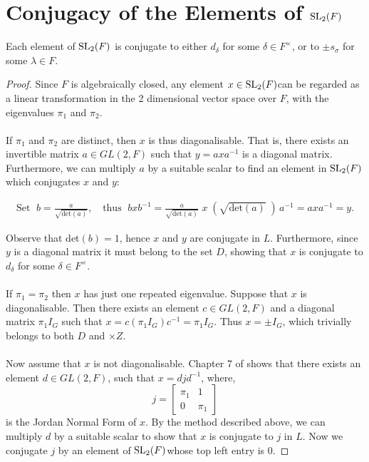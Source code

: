 \section[Conjugacy of the Elements of $L$]{Conjugacy of the Elements of $\operatorname{SL}_2(F)$}

\begin{proposition}
\label{SL2_IsConj_d_or_IsConj_s_or_IsConj_neg_s_of_AlgClosed}
\leanok
    Each element of $\operatorname{SL}_2(F)$ is conjugate to either $d_\delta$ for some $\delta \in F^\times$, or to $\pm s_\sigma$ for some $\lambda \in F$.
\end{proposition}

\begin{proof} Since $F$ is algebraically closed, any element $x \in \operatorname{SL}_2(F)$can be regarded as a linear transformation in the 2 dimensional vector space over $F$, with the eigenvalues $\pi_1$ and $\pi_2$. \\
\\
\space If $\pi_1$ and $\pi_2$ are distinct, then $x$ is thus diagonalisable. That is, there exists an invertible matrix $a \in GL(2, F)$ such that $y = axa^{-1}$ is a diagonal matrix. Furthermore, we can multiply $a$ by a suitable scalar to find an element in $\operatorname{SL}_2(F)$which conjugates $x$ and $y$:

\begin{align*} 
    \text{Set } \; b = \frac{a}{\sqrt {\text{det}(a)}}, \quad \text{thus } \; bxb^{-1} =\frac{a}{\sqrt {\text{det}(a)}} \; x \; (\sqrt{\text{det}(a)} \; )\,a^{-1} = axa^{-1} = y.
\end{align*}

Observe that det$(b)=1$, hence $x$ and $y$ are conjugate in $L$. Furthermore, since $y$ is a diagonal matrix it must belong to the set $D$, showing that $x$ is conjugate to $d_\delta$ for some $\delta \in F^\times$. \\
\\
\space If $\pi_1 = \pi_2$ then $x$ has just one repeated eigenvalue. Suppose that $x$ is diagonalisable. Then there exists an element $c \in GL(2, F)$ and a diagonal matrix $\pi_1 I_G$ such that $x = c(\pi_1 I_G)c^{-1} = \pi_1 I_G$. Thus $x = \pm I_G$, which trivially belongs to both $D$ and $\times Z$. \\
\\
Now assume that $x$ is not diagonalisable. Chapter 7 of \cite{matrix} shows that there exists an element $d \in GL(2, F)$, such that $x= djd^{-1}$, where, $$j = \begin{bmatrix} \pi_1 & 1 \\ 0 & \pi_1 \end{bmatrix}$$ is the Jordan Normal Form of $x$. By the method described above, we can multiply $d$ by a suitable scalar to show that $x$ is conjugate to $j$ in $L$. Now we conjugate $j$ by an element of $\operatorname{SL}_2(F)$whose top left entry is 0.


\end{proof}
